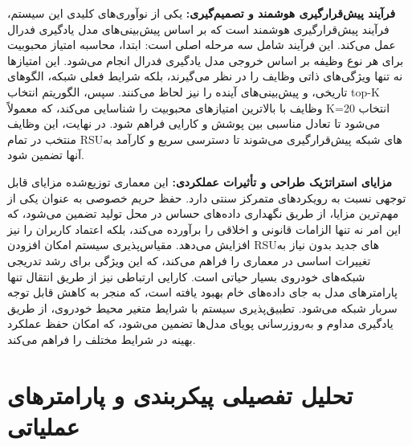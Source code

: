 \documentclass[11pt]{article}
\begin{document}
\textbf{فرآیند پیش‌قرارگیری هوشمند و تصمیم‌گیری:} یکی از نوآوری‌های کلیدی این سیستم، فرآیند پیش‌قرارگیری هوشمند است که بر اساس پیش‌بینی‌های مدل یادگیری فدرال عمل می‌کند. این فرآیند شامل سه مرحله اصلی است: ابتدا، محاسبه امتیاز محبوبیت برای هر نوع وظیفه بر اساس خروجی مدل یادگیری فدرال انجام می‌شود. این امتیازها نه تنها ویژگی‌های ذاتی وظایف را در نظر می‌گیرند، بلکه شرایط فعلی شبکه، الگوهای تاریخی، و پیش‌بینی‌های آینده را نیز لحاظ می‌کنند. سپس، الگوریتم انتخاب top-K وظایف با بالاترین امتیازهای محبوبیت را شناسایی می‌کند، که معمولاً K=20 انتخاب می‌شود تا تعادل مناسبی بین پوشش و کارایی فراهم شود. در نهایت، این وظایف منتخب در تمام RSUهای شبکه پیش‌قرارگیری می‌شوند تا دسترسی سریع و کارآمد به آنها تضمین شود.

\textbf{مزایای استراتژیک طراحی و تأثیرات عملکردی:} این معماری توزیع‌شده مزایای قابل توجهی نسبت به رویکردهای متمرکز سنتی دارد. حفظ حریم خصوصی به عنوان یکی از مهم‌ترین مزایا، از طریق نگهداری داده‌های حساس در محل تولید تضمین می‌شود، که این امر نه تنها الزامات قانونی و اخلاقی را برآورده می‌کند، بلکه اعتماد کاربران را نیز افزایش می‌دهد. مقیاس‌پذیری سیستم امکان افزودن RSUهای جدید بدون نیاز به تغییرات اساسی در معماری را فراهم می‌کند، که این ویژگی برای رشد تدریجی شبکه‌های خودروی بسیار حیاتی است. کارایی ارتباطی نیز از طریق انتقال تنها پارامترهای مدل به جای داده‌های خام بهبود یافته است، که منجر به کاهش قابل توجه سربار شبکه می‌شود. تطبیق‌پذیری سیستم با شرایط متغیر محیط خودروی، از طریق یادگیری مداوم و به‌روزرسانی پویای مدل‌ها تضمین می‌شود، که امکان حفظ عملکرد بهینه در شرایط مختلف را فراهم می‌کند.

\section{تحلیل تفصیلی پیکربندی و پارامترهای عملیاتی}
\end{document}
